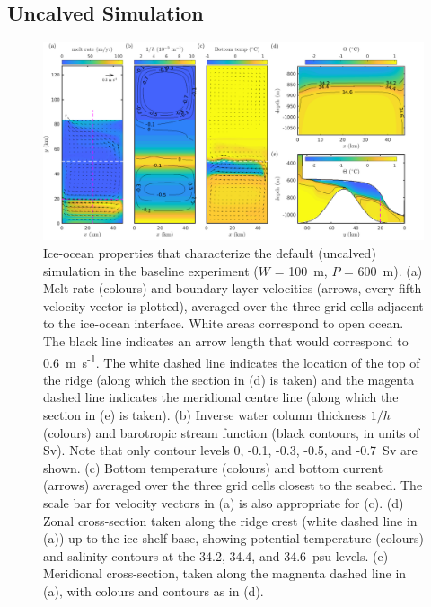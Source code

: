 \documentclass[draft]{agujournal2019}
\begin{document}
\subsection{Uncalved Simulation}\label{S:Baseline:Default}
\begin{figure}
    \centering
    \includegraphics[width = \textwidth]{../make_figures/plots/figure3-with-arrow.pdf}
    \caption{Ice-ocean properties that characterize the default (uncalved) simulation in the baseline experiment ($W$ = 100~m, $P$ = 600~m). (a) Melt rate (colours) and boundary layer velocities (arrows, every fifth velocity vector is plotted), averaged over the three grid cells adjacent to the ice-ocean interface. White areas correspond to open ocean. The black line indicates an arrow length that would correspond to 0.6~m~s\textsuperscript{-1}. The white dashed line indicates the location of the top of the ridge (along which the section in (d) is taken) and the magenta dashed line indicates the meridional centre line (along which the section in (e) is taken). (b) Inverse water column thickness $1/h$ (colours) and barotropic stream function (black contours, in units of Sv). Note that only contour levels 0, -0.1, -0.3, -0.5, and -0.7~Sv are shown. (c) Bottom temperature (colours) and bottom current (arrows) averaged over the three grid cells closest to the seabed. The scale bar for velocity vectors in (a) is also appropriate for (c). (d) Zonal cross-section taken along the ridge crest (white dashed line in (a)) up to the ice shelf base, showing potential temperature (colours) and salinity contours at the 34.2, 34.4, and 34.6~psu levels. (e) Meridional cross-section, taken along the magnenta dashed line in (a), with colours and contours as in (d).}
    \label{fig:figure3}
\end{figure}
\end{document}
